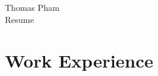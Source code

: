 \documentclass[12pt]{article} %
\begin{document}
\begin{paracol}{2} %


\parbox[top][0.12\textheight][c]{\linewidth}{ %
	\vspace{-0.04\textheight} %
	\centering %
	{\sffamily\Huge Thomas Pham}\\\medskip %
	{\Huge\color{headings}\cvtextfont Resume}
}







\section{Work Experience}


\end{paracol}
\end{document}
